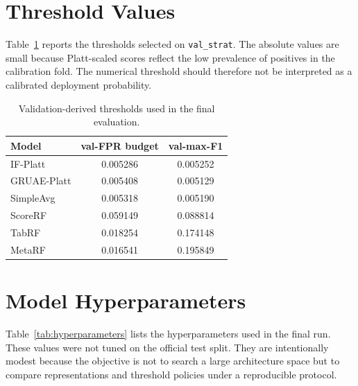 \documentclass[10pt,journal,compsoc]{IEEEtran}
\begin{document}
\section{Threshold Values}
\label{app:thresholds}

Table~\ref{tab:thresholds} reports the thresholds selected on \texttt{val\_strat}. The absolute values are small because Platt-scaled scores reflect the low prevalence of positives in the calibration fold. The numerical threshold should therefore not be interpreted as a calibrated deployment probability.

\begin{table}[t]
\centering
\caption{Validation-derived thresholds used in the final evaluation.}
\label{tab:thresholds}
\begin{tabular}{lcc}
\toprule
\textbf{Model} & \textbf{val-FPR budget} & \textbf{val-max-F1} \\
\midrule
IF-Platt & 0.005286 & 0.005252 \\
GRUAE-Platt & 0.005408 & 0.005129 \\
SimpleAvg & 0.005318 & 0.005190 \\
ScoreRF & 0.059149 & 0.088814 \\
TabRF & 0.018254 & 0.174148 \\
MetaRF & 0.016541 & 0.195849 \\
\bottomrule
\end{tabular}
\end{table}

\section{Model Hyperparameters}
\label{app:hyperparameters}

Table~\ref{tab:hyperparameters} lists the hyperparameters used in the final run. These values were not tuned on the official test split. They are intentionally modest because the objective is not to search a large architecture space but to compare representations and threshold policies under a reproducible protocol.
\end{document}
